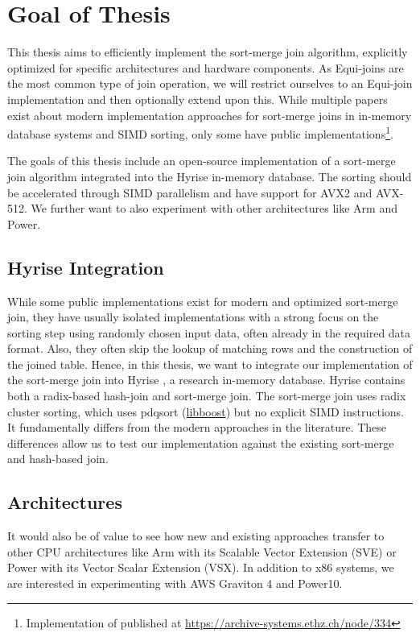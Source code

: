 \section{Goal of Thesis}
\label{sec:goal}

This thesis aims to efficiently implement the sort-merge join algorithm,
explicitly optimized for specific architectures and hardware components. 
As Equi-joins are the most common type of join operation,
we will restrict ourselves to an Equi-join implementation and then optionally extend upon this.
While multiple papers exist about modern implementation approaches for sort-merge joins in in-memory database systems
and SIMD sorting, only some have public 
implementations\footnote{Implementation of \cite{Balkesen} published at \url{https://archive-systems.ethz.ch/node/334}}.

The goals of this thesis include an open-source implementation of a sort-merge join algorithm
integrated into the Hyrise in-memory database. The sorting should be accelerated through SIMD
parallelism and have support for AVX2 and AVX-512. We further want to also experiment with
other architectures like Arm and Power.

\subsection{Hyrise Integration}
While some public implementations
exist for modern and optimized sort-merge join, they have usually isolated implementations with a strong
focus on the sorting step using randomly chosen input data, often already in the required data format. 
Also, they often skip the lookup of matching rows and the construction of the joined table.
Hence, in this thesis, we want to integrate our implementation of the sort-merge join into Hyrise
\cite{DBLP:conf/edbt/DreselerK0KUP19},
a research in-memory database. Hyrise contains both a radix-based hash-join and sort-merge join.
The sort-merge join uses radix cluster sorting, which uses pdqsort (\href{https://www.boost.org/}{libboost})
but no explicit SIMD instructions. It fundamentally differs from the modern approaches in the literature.
These differences allow us to test our implementation against the existing sort-merge and hash-based join.

\subsection{Architectures}
It would also be of value to see how new and existing approaches transfer to other CPU
architectures like Arm with its Scalable Vector Extension (SVE) or Power with its Vector Scalar
Extension (VSX). In addition to x86 systems, we are interested in experimenting with AWS Graviton 4
and Power10.

